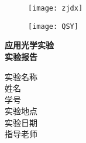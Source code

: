 \documentclass{article}
\begin{document}
\begin{titlepage}
        \vspace*{-3cm}
	
	\begin{figure}[h]
		\centering
		\texttt{[image: zjdx]}
	\end{figure}

	\vspace*{0.5cm}
	\begin{figure}[h]
		\centering
		\texttt{[image: QSY]}
	\end{figure}
	\vspace{-0.5cm}
	\begin{center}
		\Huge{\textbf{应用光学实验}}\\
		
		\Huge{\textbf{实验报告}}
	\end{center}
	
	\vspace*{0.5cm}


	\vspace*{1cm}
    \begin{center}
            \Large 实验名称\ \ \underline{} \\ 
            \vspace{0.3cm}
            \quad \Large 姓名 \ \quad \underline{} \\ 
            \vspace{0.3cm}
            \quad \Large 学号\ \quad \underline{}\\
            \vspace{0.3cm}
            \Large 实验地点\ \ \underline{}\\
            \vspace{0.3cm}
            \Large 实验日期\ \ \underline{}\\
            \vspace{0.3cm}
            \Large 指导老师\ \ \underline{}\\
            

             
    \end{center}
        
    
\end{titlepage}

\newpage
\end{document}
